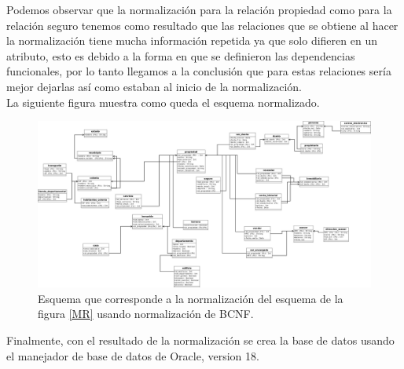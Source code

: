 \documentclass[10pt]{article}
\begin{document}
Podemos observar que la normalización para la relación propiedad como para la relación seguro tenemos como resultado que las relaciones que se obtiene al hacer la normalización tiene mucha información repetida ya que solo difieren en un atributo, esto es debido a la forma en que se definieron las dependencias funcionales, por lo tanto llegamos a la conclusión que para estas relaciones sería mejor dejarlas así como estaban al inicio de la normalización.\\

La siguiente figura muestra como queda el esquema normalizado.\\
    
    \begin{center}
    	\begin{figure}[H]
    		\centering
    		\includegraphics[width=1 \textwidth]{./modeloNormalizadoF.jpeg}
    		\caption{Esquema que corresponde a la normalización del esquema de la figura \ref{MR} usando normalización de BCNF.}
    	\end{figure}
    \end{center}
    
    
Finalmente, con el resultado de la normalización se crea  la base de datos usando el manejador de base de datos de Oracle, version 18.  \\  


    
\end{document}
